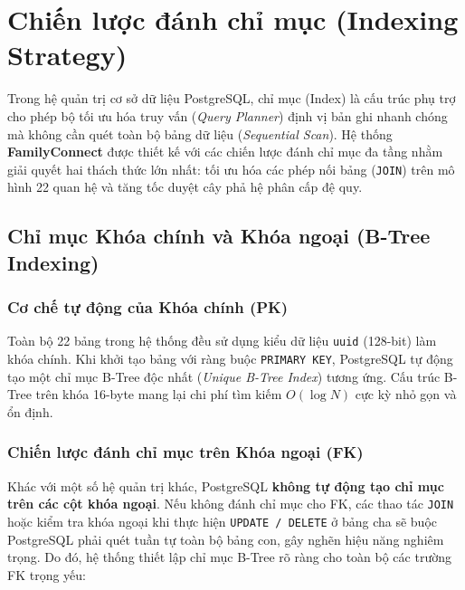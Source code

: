 \section{Chiến lược đánh chỉ mục (Indexing Strategy)}
\label{sec:3_3_chien_luoc_index}

Trong hệ quản trị cơ sở dữ liệu PostgreSQL, chỉ mục (Index) là cấu trúc phụ trợ cho phép bộ tối ưu hóa truy vấn (\textit{Query Planner}) định vị bản ghi nhanh chóng mà không cần quét toàn bộ bảng dữ liệu (\textit{Sequential Scan}). Hệ thống \textbf{FamilyConnect} được thiết kế với các chiến lược đánh chỉ mục đa tầng nhằm giải quyết hai thách thức lớn nhất: tối ưu hóa các phép nối bảng (\texttt{JOIN}) trên mô hình 22 quan hệ và tăng tốc duyệt cây phả hệ phân cấp đệ quy.

\subsection{Chỉ mục Khóa chính và Khóa ngoại (B-Tree Indexing)}

\subsubsection{Cơ chế tự động của Khóa chính (PK)}
Toàn bộ 22 bảng trong hệ thống đều sử dụng kiểu dữ liệu \texttt{uuid} (128-bit) làm khóa chính. Khi khởi tạo bảng với ràng buộc \texttt{PRIMARY KEY}, PostgreSQL tự động tạo một chỉ mục B-Tree độc nhất (\textit{Unique B-Tree Index}) tương ứng. Cấu trúc B-Tree trên khóa 16-byte mang lại chi phí tìm kiếm $O(\log N)$ cực kỳ nhỏ gọn và ổn định.

\subsubsection{Chiến lược đánh chỉ mục trên Khóa ngoại (FK)}
Khác với một số hệ quản trị khác, PostgreSQL \textbf{không tự động tạo chỉ mục trên các cột khóa ngoại}. Nếu không đánh chỉ mục cho FK, các thao tác \texttt{JOIN} hoặc kiểm tra khóa ngoại khi thực hiện \texttt{UPDATE / DELETE} ở bảng cha sẽ buộc PostgreSQL phải quét tuần tự toàn bộ bảng con, gây nghẽn hiệu năng nghiêm trọng. Do đó, hệ thống thiết lập chỉ mục B-Tree rõ ràng cho toàn bộ các trường FK trọng yếu:


